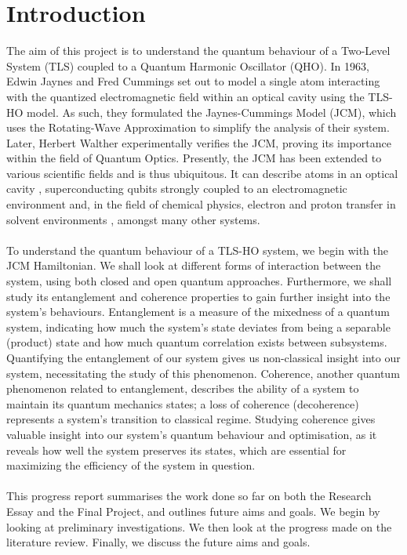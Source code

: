 \documentclass[12pt,a4paper]{article}
\begin{document}
\section{Introduction}
The aim of this project is to understand the quantum behaviour of a Two-Level System (TLS) coupled to a Quantum Harmonic Oscillator (QHO). In 1963, Edwin Jaynes and Fred Cummings set out to model a single atom interacting with the quantized electromagnetic field within an optical cavity\cite{C_JC_1963} using the TLS-HO model. As such, they formulated the Jaynes-Cummings Model (JCM), which uses the Rotating-Wave Approximation to simplify the analysis of their system. Later, Herbert Walther experimentally verifies\cite{C_JC_verification} the JCM, proving its importance within the field of Quantum Optics. Presently, the JCM has been extended to various scientific fields and is thus ubiquitous. It can describe atoms in an optical cavity \cite{H_JC_friction}, superconducting qubits strongly coupled to an electromagnetic environment\cite{C_superconducting_qubit} and, in the field of chemical physics, electron and proton transfer in solvent environments \cite{C_superconducting_qubit}, amongst many other systems.\\
\\
To understand the quantum behaviour of a TLS-HO system, we begin with the JCM Hamiltonian. We shall look at different forms of interaction between the system, using both closed and open quantum approaches. Furthermore, we shall study its entanglement and coherence properties to gain further insight into the system's behaviours. Entanglement is a measure of the mixedness of a quantum system, indicating how much the system's state deviates from being a separable (product) state\cite{E_WC_Definition} and how much quantum correlation exists between subsystems. Quantifying the entanglement of our system gives us non-classical insight into our system, necessitating the study of this phenomenon. Coherence, another quantum phenomenon related\cite{...} to entanglement, describes the ability of a system to maintain its quantum mechanics states; a loss of coherence (decoherence) represents a system's transition to classical regime. Studying coherence gives valuable insight into our system's quantum behaviour and optimisation, as it reveals how well the system preserves its states, which are essential for maximizing the efficiency of the system in question.\\
\\
This progress report summarises the work done so far on both the Research Essay and the Final Project, and outlines future aims and goals. We begin by looking at preliminary investigations. We then look at the progress made on the literature review. Finally, we discuss the future aims and goals.
\end{document}
